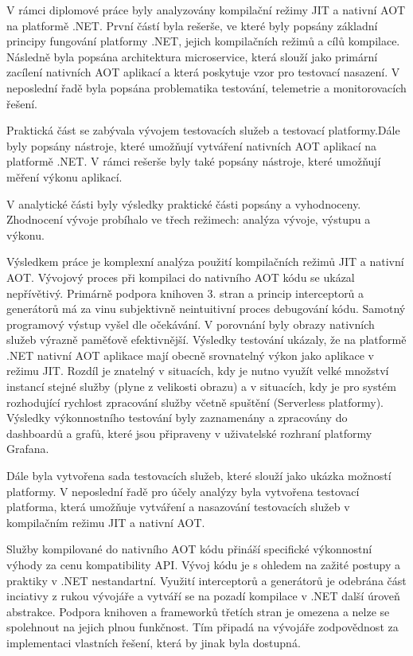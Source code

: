 
V rámci diplomové práce byly analyzovány kompilační režimy JIT a nativní AOT na platformě .NET. První částí byla rešerše, ve které byly popsány základní principy fungování platformy .NET, jejich kompilačních režimů a cílů kompilace. Následně byla popsána architektura microservice, která slouží jako primární zacílení nativních AOT aplikací a která poskytuje vzor pro testovací nasazení. V neposlední řadě byla popsána problematika testování, telemetrie a monitorovacích řešení.

Praktická část se zabývala vývojem testovacích služeb a testovací platformy.Dále byly popsány nástroje, které umožňují vytváření nativních AOT aplikací na platformě .NET. V rámci rešerše byly také popsány nástroje, které umožňují měření výkonu aplikací.

V analytické části byly výsledky praktické části popsány a vyhodnoceny. Zhodnocení vývoje probíhalo ve třech režimech: analýza vývoje, výstupu a výkonu.

Výsledkem práce je komplexní analýza použití kompilačních režimů JIT a nativní AOT. Vývojový proces při kompilaci do nativního AOT kódu se ukázal nepřívětivý. Primárně podpora knihoven 3. stran a princip interceptorů a generátorů má za vinu subjektivně neintuitivní proces debugování kódu. Samotný programový výstup vyšel dle očekávání. V porovnání byly obrazy nativních služeb výrazně paměťově efektivnější. Výsledky testování ukázaly, že na platformě .NET nativní AOT aplikace mají obecně srovnatelný výkon jako aplikace v režimu JIT. Rozdíl je znatelný v situacích, kdy je nutno využít velké množství instancí stejné služby (plyne z velikosti obrazu) a v situacích, kdy je pro systém rozhodující rychlost zpracování služby včetně spuštění (Serverless platformy). Výsledky výkonnostního testování byly zaznamenány a zpracovány do dashboardů a grafů, které jsou připraveny v uživatelské rozhraní platformy Grafana.

Dále byla vytvořena sada testovacích služeb, které slouží jako ukázka možností platformy. V neposlední řadě pro účely analýzy byla vytvořena testovací platforma, která umožňuje vytváření a nasazování testovacích služeb v kompilačním režimu JIT a nativní AOT.

Služby kompilované do nativního AOT kódu přináší specifické výkonnostní výhody za cenu kompatibility API. Vývoj kódu je s ohledem na zažité postupy a praktiky v .NET nestandartní. Využití interceptorů a generátorů je odebrána část inciativy z rukou vývojáře a vytváří se na pozadí kompilace v .NET další úroveň abstrakce. Podpora knihoven a frameworků třetích stran je omezena a nelze se spolehnout na jejich plnou funkčnost. Tím připadá na vývojáře zodpovědnost za implementaci vlastních řešení, která by jinak byla dostupná.

